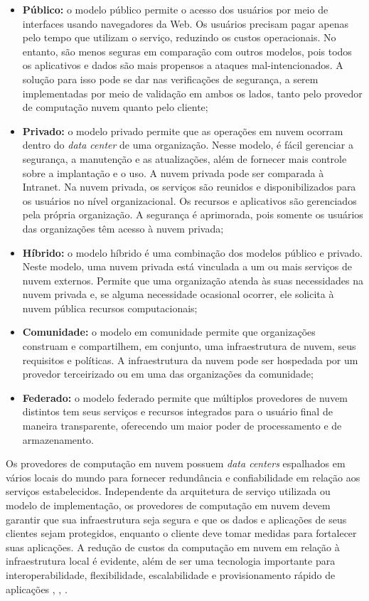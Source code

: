 \begin{itemize}
    \item \textbf{Público:} o modelo público permite o acesso dos usuários por meio de interfaces usando navegadores da Web. Os usuários precisam pagar apenas pelo tempo que utilizam o serviço, reduzindo os custos operacionais. No entanto, são menos seguras em comparação com outros modelos, pois todos os aplicativos e dados são mais propensos a ataques mal-intencionados. A solução para isso pode se dar nas verificações de segurança, a serem implementadas por meio de validação em ambos os lados, tanto pelo provedor de computação nuvem quanto pelo cliente;
    \item \textbf{Privado:} o modelo privado permite que as operações em nuvem ocorram dentro do \textit{data center} de uma organização. Nesse modelo, é fácil gerenciar a segurança, a manutenção e as atualizações, além de fornecer mais controle sobre a implantação e o uso. A nuvem privada pode ser comparada à Intranet. Na nuvem privada, os serviços são reunidos e disponibilizados para os usuários no nível organizacional. Os recursos e aplicativos são gerenciados pela própria organização. A segurança é aprimorada, pois somente os usuários das organizações têm acesso à nuvem privada;
    \item \textbf{Híbrido:} o modelo híbrido é uma combinação dos modelos público e privado. Neste modelo, uma nuvem privada está vinculada a um ou mais serviços de nuvem externos. Permite que uma organização atenda às suas necessidades na nuvem privada e, se alguma necessidade ocasional ocorrer, ele solicita à nuvem pública recursos computacionais;
    \item \textbf{Comunidade:} o modelo em comunidade permite que organizações construam e compartilhem, em conjunto, uma infraestrutura de nuvem, seus requisitos e políticas. A infraestrutura da nuvem pode ser hospedada por um provedor terceirizado ou em uma das organizações da comunidade;
    \item \textbf{Federado:} o modelo federado permite que múltiplos provedores de nuvem distintos tem seus serviços e recursos integrados para o usuário final de maneira transparente, oferecendo um maior poder de processamento e de armazenamento.
\end{itemize}


Os provedores de computação em nuvem possuem \textit{data centers} espalhados em vários locais do mundo para fornecer redundância e confiabilidade em relação aos serviços estabelecidos. Independente da arquitetura de serviço utilizada ou modelo de implementação, os provedores de computação em nuvem devem garantir que sua infraestrutura seja segura e que os dados e aplicações de seus clientes sejam protegidos, enquanto o cliente deve tomar medidas para fortalecer suas aplicações. A redução de custos da computação em nuvem em relação à infraestrutura local é evidente, além de ser uma tecnologia importante para interoperabilidade, flexibilidade, escalabilidade e provisionamento rápido de aplicações \cite{Zhang2010}, \cite{Jadeja2012}, \cite{Puthal2015}.

